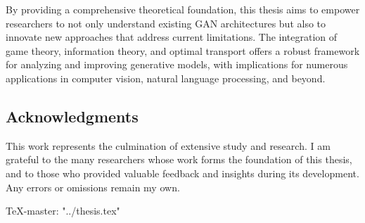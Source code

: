 By providing a comprehensive theoretical foundation, this thesis aims to empower researchers to not only understand existing GAN architectures but also to innovate new approaches that address current limitations. The integration of game theory, information theory, and optimal transport offers a robust framework for analyzing and improving generative models, with implications for numerous applications in computer vision, natural language processing, and beyond.

\subsection*{Acknowledgments}

This work represents the culmination of extensive study and research. I am grateful to the many researchers whose work forms the foundation of this thesis, and to those who provided valuable feedback and insights during its development. Any errors or omissions remain my own.

TeX-master: "../thesis.tex"
